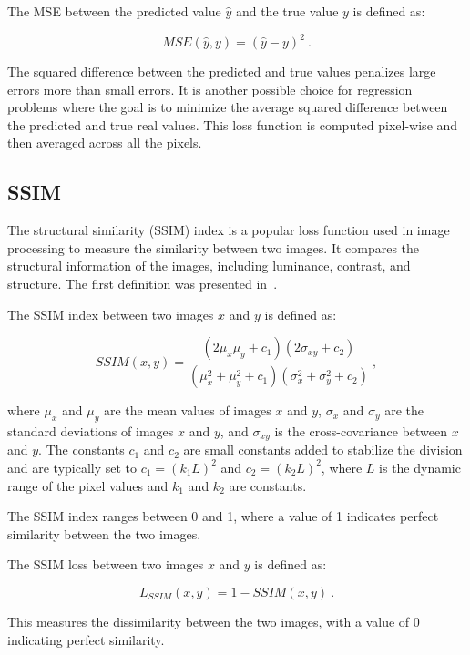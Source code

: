 The MSE between the predicted value $\hat{y}$ and the true value $y$ is defined as:

\begin{equation}
MSE(\hat{y},y) = (\hat{y} - y)^2\:.
\end{equation}

The squared difference between the predicted and true values penalizes large errors more than small errors. It is another possible choice for regression problems where the goal is to minimize the average squared difference between the predicted and true real values. This loss function is computed pixel-wise and then averaged across all the pixels.


\subsection{SSIM}
\label{methods:losses:SSIM}
The structural similarity (SSIM) index is a popular loss function used in image processing to measure the similarity between two images. It compares the structural information of the images, including luminance, contrast, and structure. The first definition was presented in~\citep{wang2004image}.

The SSIM index between two images $x$ and $y$ is defined as:

\begin{equation}
SSIM(x,y) = \frac{(2\mu_x\mu_y + c_1)(2\sigma_{xy} + c_2)}{(\mu_x^2 + \mu_y^2 + c_1)(\sigma_x^2 + \sigma_y^2 + c_2)}\:,
\end{equation}

where $\mu_x$ and $\mu_y$ are the mean values of images $x$ and $y$, $\sigma_x$ and $\sigma_y$ are the standard deviations of images $x$ and $y$, and $\sigma_{xy}$ is the cross-covariance between $x$ and $y$. The constants $c_1$ and $c_2$ are small constants added to stabilize the division and are typically set to $c_1=(k_1L)^2$ and $c_2=(k_2L)^2$, where $L$ is the dynamic range of the pixel values and $k_1$ and $k_2$ are constants.

The SSIM index ranges between 0 and 1, where a value of 1 indicates perfect similarity between the two images.

The SSIM loss between two images $x$ and $y$ is defined as:

\begin{equation}
L_{SSIM}(x,y) = 1 - SSIM(x,y)\:.
\end{equation}

This measures the dissimilarity between the two images, with a value of 0 indicating perfect similarity.

